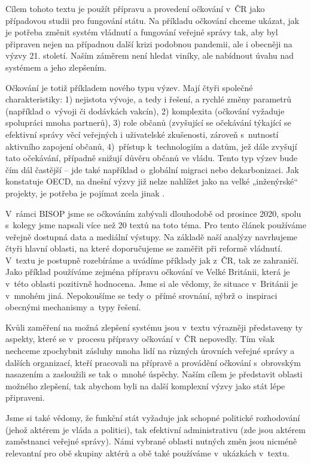\newpage 

Cílem tohoto textu je použít přípravu a provedení očkování v~ČR jako případovou studii pro fungování státu. Na příkladu očkování chceme ukázat, jak je potřeba změnit systém vládnutí a fungování veřejné správy tak, aby byl připraven nejen na případnou další krizi podobnou pandemii, ale i obecněji na výzvy 21. století. Naším záměrem není hledat viníky, ale nabídnout úvahu nad systémem a jeho zlepšením.


Očkování je totiž příkladem nového typu výzev. Mají čtyři společné charakteristiky: 1) nejistota vývoje, a tedy i řešení, a rychlé změny parametrů (například o~vývoji či dodávkách vakcín), 2) komplexita (očkování vyžaduje spolupráci mnoha partnerů), 3) role občanů (zvyšující se očekávání týkající se efektivní správy věcí veřejných i uživatelské zkušenosti, zároveň s~nutností aktivního zapojení občanů, 4)~přístup k~technologiím a datům, jež dále zvyšují tato očekávání, případně snižují důvěru občanů ve vládu. Tento typ výzev bude čím dál častější -- jde také například o~globální migraci nebo dekarbonizaci. Jak konstatuje OECD, na dnešní výzvy již nelze nahlížet jako na velké „inženýrské“ projekty, je potřeba je pojímat zcela jinak \cite{oecd_public_governance_reviews_skills_2020}.


V~rámci BISOP jsme se očkováním zabývali dlouhodobě od prosince 2020, spolu s~kolegy jsme napsali více než 20 textů na toto téma. Pro tento článek používáme veřejně dostupná data a mediální výstupy. Na základě naší analýzy navrhujeme čtyři hlavní oblasti, na které doporučujeme se zaměřit při reformě vládnutí. V~textu je postupně rozebíráme a uvádíme příklady jak z~ČR, tak ze zahraničí. Jako příklad používáme zejména přípravu očkování ve Velké Británii, která je v~této oblasti pozitivně hodnocena. Jsme si ale vědomy, že situace v~Británii je v~mnohém jiná. Nepokoušíme se tedy o~přímé srovnání, nýbrž o~inspiraci obecnými mechanismy a~typy řešení.

\newpage

Kvůli zaměření na možná zlepšení systému jsou v~textu výrazněji představeny ty aspekty, které se v~procesu přípravy očkování v~ČR nepovedly. Tím však nechceme zpochybnit zásluhy mnoha lidí na různých úrovních veřejné správy a dalších organizací, kteří pracovali na přípravě a provádění očkování s~obrovským nasazením a zasloužili se tak o~mnohé úspěchy. Naším cílem je představit oblasti možného zlepšení, tak abychom byli na další komplexní výzvy jako stát lépe připraveni.

Jsme si také vědomy, že funkční stát vyžaduje jak schopné politické rozhodování (jehož aktérem je vláda a politici), tak efektivní administrativu (zde jsou aktérem zaměstnanci veřejné správy). Námi vybrané oblasti nutných změn jsou nicméně relevantní pro obě skupiny aktérů a obě také používáme v~ukázkách v~textu. 

